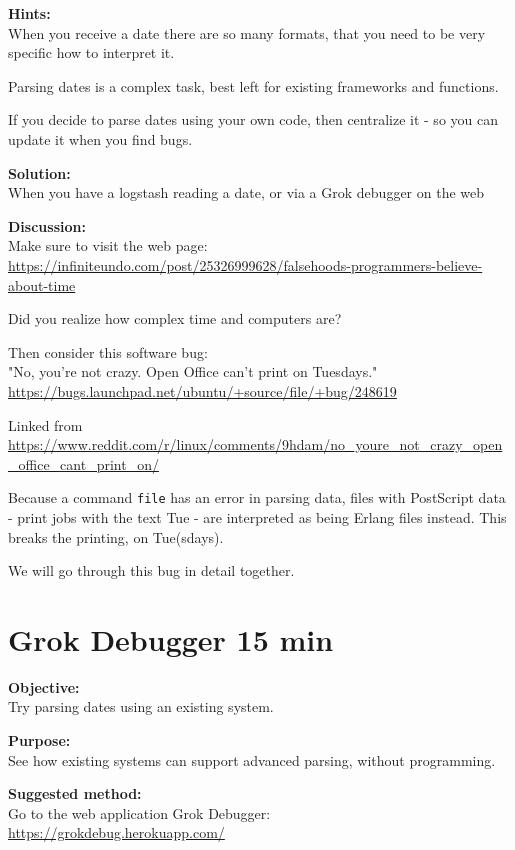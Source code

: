 \documentclass[a4paper,11pt,notitlepage]{report}
\begin{document}
{\bf Hints:}\\
When you receive a date there are so many formats, that you need to be very specific how to interpret it.

Parsing dates is a complex task, best left for existing frameworks and functions.

If you decide to parse dates using your own code, then centralize it - so you can update it when you find bugs.

{\bf Solution:}\\
When you have a logstash reading a date, or via a Grok debugger on the web

{\bf Discussion:}\\
Make sure to visit the web page:\\
\url{https://infiniteundo.com/post/25326999628/falsehoods-programmers-believe-about-time}

Did you realize how complex time and computers are?

Then consider this software bug:\\
"No, you're not crazy. Open Office can't print on Tuesdays."\\
\url{https://bugs.launchpad.net/ubuntu/+source/file/+bug/248619}

Linked from\\
{\footnotesize\url{https://www.reddit.com/r/linux/comments/9hdam/no_youre_not_crazy_open_office_cant_print_on/}}

Because a command \verb+file+ has an error in parsing data, files with PostScript data - print jobs with the text Tue - are interpreted as being Erlang files instead. This breaks the printing, on Tue(sdays).

We will go through this bug in detail together.


\chapter{Grok Debugger 15 min}
\label{ex:grokdebugger1}


{\bf Objective:}\\
Try parsing dates using an existing system.

{\bf Purpose:}\\
See how existing systems can support advanced parsing, without programming.

{\bf Suggested method:}\\
Go to the web application Grok Debugger:\\
\url{https://grokdebug.herokuapp.com/}
\end{document}
